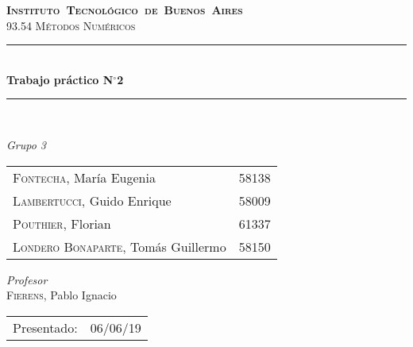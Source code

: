 \begin{titlepage}
\newcommand{\HRule}{\rule{\linewidth}{0.5mm}}
\center
\mbox{\textsc{\LARGE \bfseries {Instituto Tecnológico de Buenos Aires}}}\\[1.5cm]
\textsc{\Large 93.54 Métodos Numéricos}\\[0.5cm]


\HRule \\[0.6cm]
{ \Huge \bfseries Trabajo práctico N$^{\circ}$2}\\[0.4cm] 
\HRule \\[1.5cm]


{\large

\emph{Grupo 3}\\
\vspace{3px}

\begin{tabular}{lr} 	
\textsc{Fontecha}, María Eugenia  & 58138 \\
\textsc{Lambertucci}, Guido Enrique  & 58009 \\
\textsc{Pouthier}, Florian  & 61337 \\
\textsc{Londero Bonaparte}, Tomás Guillermo  & 58150 \\
\end{tabular}

\vspace{20px}

\emph{Profesor}\\
\vspace{3px}
\textsc{Fierens}, Pablo Ignacio\\ 	

\vspace{100px}

\begin{tabular}{ll}

Presentado: & 06/06/19\\

\end{tabular}

}

\vfill

\end{titlepage}
